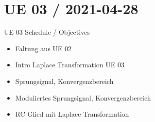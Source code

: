 \documentclass[mathserif, aspectratio=43]{intbeamer}
\begin{document}
\section{UE 03 / 2021-04-28}
\begin{frame}{UE 03 Schedule / Objectives}

\begin{itemize}
\item Faltung aus UE 02
\item Intro Laplace Transformation UE 03
\item Sprungsignal, Konvergenzbereich
\item Moduliertes Sprungsignal, Konvergenzbereich
\item RC Glied mit Laplace Transformation
\end{itemize}

\end{frame}
\end{document}
